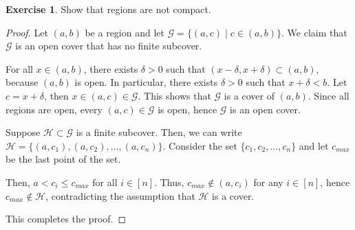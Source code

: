 \documentclass[11pt]{article}
\renewcommand{\_}[1]{\underline{ #1 }}
\theoremstyle{definition}
\newtheorem{exercise}[theorem]{Exercise}
\numberwithin{equation}{subsection}
\begin{document}
\begin{exercise}
Show that regions are not compact.

\begin{proof}
Let $(a,b)$ be a region and let $\mathcal{G} = \{(a,c) \mid c\in (a,b)\}$. We claim that $\mathcal{G}$ is an open cover that has no finite subcover.

For all $x \in (a,b)$, there exists $\delta>0$ such that $(x- \delta, x+ \delta) \subset (a,b)$, because $(a,b)$ is open. In particular, there exists $\delta>0$ such that $x+ \delta <b$.  Let $c = x + \delta$, then $x \in (a,c) \in \mathcal{G}$. This shows that $\mathcal{G}$ is a cover of $(a,b)$. Since all regions are open, every $(a,c) \in \mathcal{G}$ is open, hence $\mathcal{G}$ is an open cover.

Suppose $\mathcal{H} \subset \mathcal{G}$ is a finite subcover. Then, we can write $\mathcal{H} = \{(a,c_1), (a,c_2), \dots, (a,c_n)\}$. Consider the set $\{c_1, c_2, \dots, c_n\}$ and let $c_{max}$ be the last point of the set.

Then, $a<c_i\leq c_{max}$ for all $i \in [n]$. Thus, $c_{max} \notin (a,c_i)$ for any $i \in [n]$, hence $c_{max} \notin \mathcal{H}$, contradicting the assumption that $\mathcal{H}$ is a cover.

This completes the proof.


\renewcommand\qedsymbol{QED}
\end{proof}


\end{exercise} 
\end{document}
